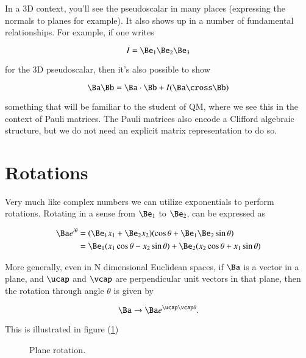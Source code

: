 In a 3D context, you'll see the pseudoscalar in many places (expressing the normals to planes for example).  It also shows up in a number of fundamental relationships.  For example, if one writes

\begin{equation}\label{eqn:gaQuickIntro:150}
I = \Be_1 \Be_2 \Be_3
\end{equation}

for the 3D pseudoscalar, then it's also possible to show

\begin{equation}\label{eqn:gaQuickIntro:170}
\Ba \Bb = \Ba \cdot \Bb + I (\Ba \cross \Bb)
\end{equation}

something that will be familiar to the student of QM, where we see this in the context of Pauli matrices.  The Pauli matrices also encode a Clifford algebraic structure, but we do not need an explicit matrix representation to do so.

\section{Rotations}

Very much like complex numbers we can utilize exponentials to perform rotations.  Rotating in a sense from $\Be_1$ to $\Be_2$, can be expressed as

\begin{align*}
\Ba e^{i \theta}
&=
(\Be_1 x_1 + \Be_2 x_2) (\cos\theta + \Be_1 \Be_2 \sin\theta) \\
&=
\Be_1 (x_1 \cos\theta - x_2 \sin\theta)
+
\Be_2 (x_2 \cos\theta + x_1 \sin\theta)
\end{align*}

More generally, even in N dimensional Euclidean spaces, if $\Ba$ is a vector in a plane, and $\ucap$ and $\vcap$ are perpendicular unit vectors in that plane, then the rotation through angle $\theta$ is given by

\begin{equation}\label{eqn:gaQuickIntro:190}
\Ba \rightarrow \Ba e^{\ucap \vcap \theta}.
\end{equation}

This is illustrated in figure (\ref{fig:gaQuickIntro:gaQuickIntroFig1})

\begin{figure}[htp]
   \centering
   \def\svgwidth{0.6\columnwidth}
   
   \caption{Plane rotation.}\label{fig:gaQuickIntro:gaQuickIntroFig1}
\end{figure}

